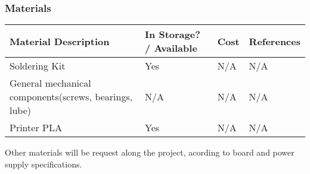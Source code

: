 \documentclass[a4paper,12pt]{article}
\begin{document}
		\subsubsection{Materials}
		\begin{center}
		\begin{table}[H]
			\begin{tabular}{||p{3cm}|p{3cm}|p{3cm}|p{3cm}||}
			\hline
			Material Description & In Storage? / Available & Cost & References \\ \hline
			Soldering Kit & Yes & N/A & N/A\\ \hline
			General mechanical components(screws, bearings, lube) & N/A & N/A &N/A \\ \hline
			Printer PLA & Yes & N/A & N/A \\ \hline
			\end{tabular}
		\end{table}
		\end{center}
		Other materials will be request along the project, acording to board and power supply specifications.
\end{document}
